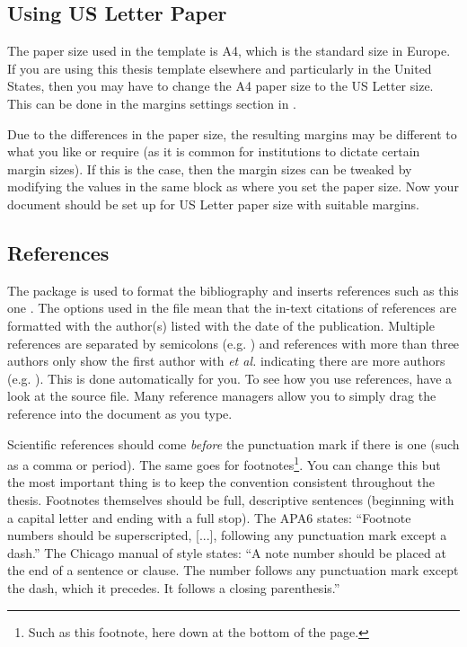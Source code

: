 \subsection{Using US Letter Paper}

The paper size used in the template is A4, which is the standard size in Europe. 
If you are using this thesis template elsewhere and particularly in the United 
States, then you may have to change the A4 paper size to the US Letter size. 
This can be done in the margins settings section in .

Due to the differences in the paper size, the resulting margins may be different 
to what you like or require (as it is common for institutions to dictate certain 
margin sizes). If this is the case, then the margin sizes can be tweaked by 
modifying the values in the same block as where you set the paper size. Now 
your document should be set up for US Letter paper size with suitable margins.

\subsection{References}

The  package is used to format the bibliography and inserts 
references such as this one \parencite{Reference1}. The options used in the 
 file mean that the in-text citations of references are formatted 
with the author(s) listed with the date of the publication. Multiple references 
are separated by semicolons (e.g. \parencite{Reference2, Reference1}) and 
references with more than three authors only show the first author with 
\emph{et al.} indicating there are more authors (e.g. \citep{Reference3}). 
This is done automatically for you. To see how you use references, have a look 
at the  source file. Many reference managers allow you to 
simply drag the reference into the document as you type.

Scientific references should come \emph{before} the punctuation mark if there is 
one (such as a comma or period). The same goes for footnotes\footnote{Such as 
this footnote, here down at the bottom of the page.}. You can change this but 
the most important thing is to keep the convention consistent throughout the 
thesis. Footnotes themselves should be full, descriptive sentences (beginning 
with a capital letter and ending with a full stop). The APA6 states: 
\enquote{Footnote numbers should be superscripted, [...], following any 
punctuation mark except a dash.} The Chicago manual of style states: \enquote{A 
note number should be placed at the end of a sentence or clause. The number 
follows any punctuation mark except the dash, which it precedes. It follows a 
closing parenthesis.}

